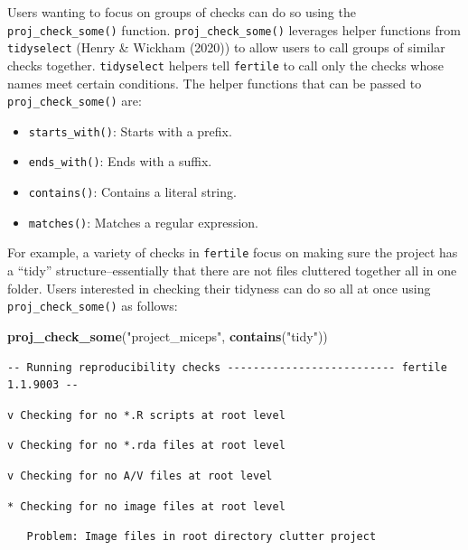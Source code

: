 \documentclass[12pt,twoside]{reedthesis}
\newenvironment{Shaded}{\begin{snugshade}}{\end{snugshade}}
\newcommand{\KeywordTok}[1]{\textcolor[rgb]{0.13,0.29,0.53}{\textbf{#1}}}
\newcommand{\NormalTok}[1]{#1}
\newcommand{\StringTok}[1]{\textcolor[rgb]{0.31,0.60,0.02}{#1}}
\providecommand{\tightlist}{%
  \setlength{\itemsep}{0pt}\setlength{\parskip}{0pt}}
\begin{document}
Users wanting to focus on groups of checks can do so using the \texttt{proj\_check\_some()} function.
\texttt{proj\_check\_some()} leverages helper functions from \texttt{tidyselect} (Henry \& Wickham (2020)) to allow users to call groups of similar checks together. \texttt{tidyselect} helpers tell \texttt{fertile} to call only the checks whose names meet certain conditions. The helper functions that can be passed to \texttt{proj\_check\_some()} are:
\begin{itemize}
\tightlist
\item
  \texttt{starts\_with()}: Starts with a prefix.
\item
  \texttt{ends\_with()}: Ends with a suffix.
\item
  \texttt{contains()}: Contains a literal string.
\item
  \texttt{matches()}: Matches a regular expression.
\end{itemize}
For example, a variety of checks in \texttt{fertile} focus on making sure the project has a ``tidy'' structure--essentially that there are not files cluttered together all in one folder. Users interested in checking their tidyness can do so all at once using \texttt{proj\_check\_some()} as follows:
\begin{Shaded}
\begin{Highlighting}[]
\KeywordTok{proj_check_some}\NormalTok{(}\StringTok{"project_miceps"}\NormalTok{, }\KeywordTok{contains}\NormalTok{(}\StringTok{"tidy"}\NormalTok{))}
\end{Highlighting}
\end{Shaded}
\footnotesize
\begin{verbatim}
-- Running reproducibility checks -------------------------- fertile 1.1.9003 --
\end{verbatim}
\begin{verbatim}
v Checking for no *.R scripts at root level
\end{verbatim}
\begin{verbatim}
v Checking for no *.rda files at root level
\end{verbatim}
\begin{verbatim}
v Checking for no A/V files at root level
\end{verbatim}
\begin{verbatim}
* Checking for no image files at root level
\end{verbatim}
\begin{verbatim}
   Problem: Image files in root directory clutter project
\end{verbatim}
\end{document}
